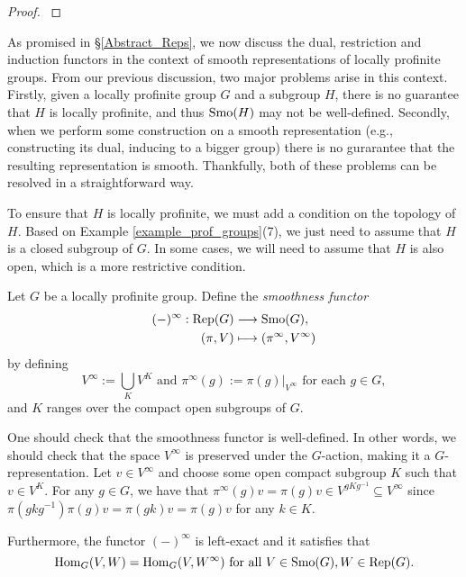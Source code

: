 \begin{proof}
    \cite[Proposition 2.3 and Corollary 1.2]{BH1}
\end{proof}

As promised in \S\ref{Abstract_Reps}, we now discuss the dual, restriction and induction functors in the context of smooth representations of locally profinite groups. From our previous discussion, two major problems arise in this context. Firstly, given a locally profinite group $G$ and a subgroup $H$, there is no guarantee that $H$ is locally profinite, and thus $\mathrm{Smo}(H)$ may not be well-defined. Secondly, when we perform some construction on a smooth representation (e.g., constructing its dual, inducing to a bigger group) there is no gurarantee that the resulting representation is smooth. Thankfully, both of these problems can be resolved in a straightforward way.

To ensure that $H$ is locally profinite, we must add a condition on the topology of $H$. Based on Example \ref{example_prof_groups}(7), we just need to assume that $H$ is a closed subgroup of $G$. In some cases, we will need to assume that $H$ is also open, which is a more restrictive condition. 

\begin{defn}
    Let $G$ be a locally profinite group. Define the \textit{smoothness functor}
    \begin{align*}
        (-)^\infty:\mathrm{Rep}(G)&\longrightarrow\mathrm{Smo}(G),\\
        (\pi,V)&\longmapsto(\pi^\infty,V^\infty)
    \end{align*}
    by defining 
    $$V^\infty:=\bigcup_K V^K \text{  and  } \pi^\infty(g):=\pi(g)|_{V^\infty} \text{  for each  } g\in G,$$ and $K$ ranges over the compact open subgroups of $G$.
\end{defn}

\begin{rem}
    One should check that the smoothness functor is well-defined. In other words, we should check that the space $V^\infty$ is preserved under the $G$-action, making it a $G$-representation. Let $v\in V^\infty$ and choose some open compact subgroup $K$ such that $v\in V^K$. For any $g\in G$, we have that $\pi^\infty(g)v=\pi(g)v\in V^{gKg^{-1}}\subseteq V^\infty$ since $\pi(gkg^{-1})\pi(g)v=\pi(gk)v=\pi(g)v$ for any $k\in K$.
\end{rem}

Furthermore, the functor $(-)^\infty$ is left-exact and it satisfies that
$$\mathrm{Hom}_G(V,W)=\mathrm{Hom}_G(V,W^\infty) \text{ for all } V\in\mathrm{Smo}(G), W\in\mathrm{Rep}(G).$$

